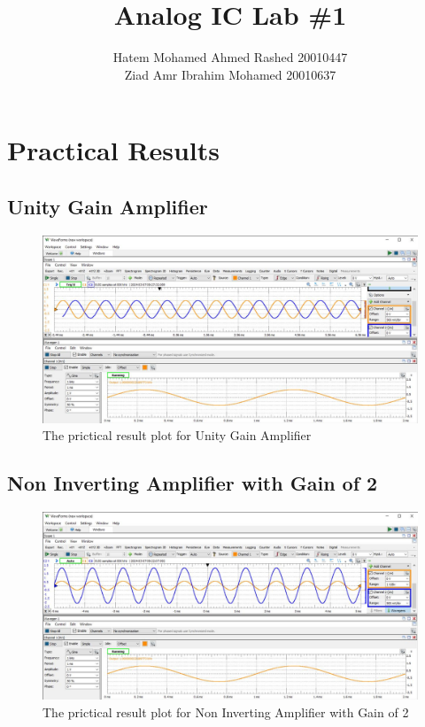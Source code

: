 \documentclass{article}
\begin{document}
\title{\textbf{Analog IC Lab \#1}}
\date{} %
\author{{Hatem Mohamed Ahmed Rashed}{	20010447} \\
{Ziad Amr Ibrahim Mohamed}{	20010637} }
\maketitle

	\section{Practical Results}
	\subsection{Unity Gain Amplifier}
	\begin{figure}[H]
		\centering
		\includegraphics[width=1\textwidth]{unity_gain.jpg}
		\caption{The prictical result plot for Unity Gain Amplifier}
		\label{fig:practiacal_unity}
	\end{figure}
	\subsection{Non Inverting Amplifier with Gain of 2}
	\begin{figure}[H]
		\centering
		\includegraphics[width=1\textwidth]{gain_2.jpg}
		\caption{The prictical result plot for Non Inverting Amplifier with Gain of 2}
		\label{fig:2Gain}
	\end{figure}
	
\end{document}
